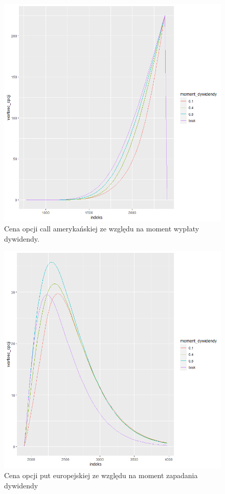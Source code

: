\documentclass[12pt]{article}
\begin{document}
\begin{figure}[H]
    \centering
    \includegraphics[width=\textwidth,height=\textheight,keepaspectratio]{dividend/call_A_procent_moment_dywidendy.png}
    \caption{Cena opcji call amerykańskiej ze względu na moment wypłaty dywidendy.}
    \label{fig:moment_call_A}
\end{figure}

\begin{figure}[H]
    \centering
    \includegraphics[width=\textwidth,height=\textheight,keepaspectratio]{dividend/put_EU_procent_moment_dywidendy.png}
    \caption{Cena opcji put europejskiej ze względu na moment zapadania dywidendy}
    \label{fig:moment_put_EU}
\end{figure}
\end{document}
